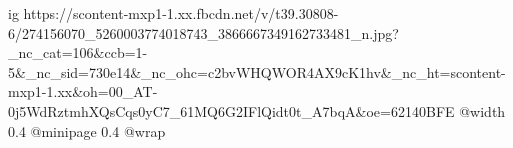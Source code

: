  
 
 
 
 

\ifcmt
  ig https://scontent-mxp1-1.xx.fbcdn.net/v/t39.30808-6/274156070_5260003774018743_3866667349162733481_n.jpg?_nc_cat=106&ccb=1-5&_nc_sid=730e14&_nc_ohc=c2bvWHQWOR4AX9cK1hv&_nc_ht=scontent-mxp1-1.xx&oh=00_AT-0j5WdRztmhXQsCqs0yC7_61MQ6G2IFlQidt0t_A7bqA&oe=62140BFE
  @width 0.4
  @minipage 0.4
  @wrap \parpic[r]
\fi
